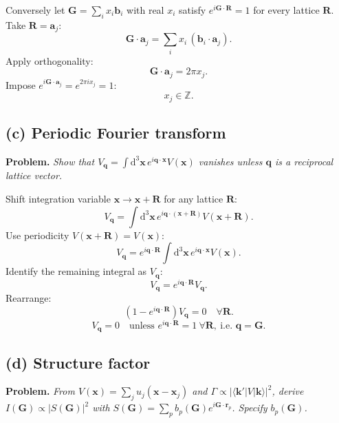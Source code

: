 \documentclass[11pt]{article}
\newcommand{\de}{\mathrm{d}}
\begin{document}
Conversely let $\bm G=\sum_i x_i\bm b_i$ with real $x_i$ satisfy $e^{i\bm G\cdot\bm R}=1$ for every lattice $\bm R$. Take $\bm R=\bm a_j$:
\[
\bm G\cdot\bm a_j = \sum_i x_i\,(\bm b_i \cdot \bm a_j).
\]
Apply orthogonality:
\[
\bm G\cdot\bm a_j = 2\pi x_j.
\]
Impose $e^{i\bm G\cdot\bm a_j}=e^{2\pi i x_j}=1$:
\[
x_j\in\mathbb Z.
\]

\subsection*{(c) Periodic Fourier transform}

\textbf{Problem.} \emph{Show that $V_{\bm q}=\int\de^3\bm x\,e^{i\bm q\cdot\bm x}V(\bm x)$ vanishes unless $\bm q$ is a reciprocal lattice vector.}

Shift integration variable $\bm x\to\bm x+\bm R$ for any lattice $\bm R$:
\[
V_{\bm q} = \int\de^3\bm x\, e^{i\bm q\cdot(\bm x+\bm R)} V(\bm x+\bm R).
\]
Use periodicity $V(\bm x+\bm R)=V(\bm x)$:
\[
V_{\bm q} = e^{i\bm q\cdot\bm R}\int\de^3\bm x\, e^{i\bm q\cdot\bm x}V(\bm x).
\]
Identify the remaining integral as $V_{\bm q}$:
\[
V_{\bm q} = e^{i\bm q\cdot\bm R}V_{\bm q}.
\]
Rearrange:
\[
(1-e^{i\bm q\cdot\bm R})V_{\bm q}=0 \quad \forall\bm R.
\]
\[
\boxed{\;V_{\bm q}=0\quad\text{unless } e^{i\bm q\cdot\bm R}=1\ \forall\bm R,\ \text{i.e.\ } \bm q=\bm G.\;}
\]

\subsection*{(d) Structure factor}

\textbf{Problem.} \emph{From $V(\bm x)=\sum_j u_j(\bm x-\bm x_j)$ and $\Gamma\propto|\langle\bm k'|V|\bm k\rangle|^2$, derive $I(\bm G)\propto|S(\bm G)|^2$ with $S(\bm G)=\sum_p b_p(\bm G)e^{i\bm G\cdot\bm r_p}$. Specify $b_p(\bm G)$.}
\end{document}
